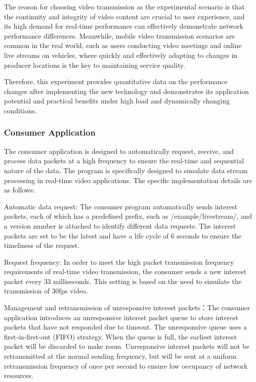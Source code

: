 \documentclass[conference]{IEEEtran}
\begin{document}
The reason for choosing video transmission as the experimental scenario is that the continuity and integrity of video content are crucial to user experience, and its high demand for real-time performance can effectively demonstrate network performance differences. Meanwhile, mobile video transmission scenarios are common in the real world, such as users conducting video meetings and online live streams on vehicles, where quickly and effectively adapting to changes in producer locations is the key to maintaining service quality.

Therefore, this experiment provides quantitative data on the performance changes after implementing the new technology and demonstrates its application potential and practical benefits under high load and dynamically changing conditions.

\subsubsection{Consumer Application}
The consumer application is designed to automatically request, receive, and process data packets at a high frequency to ensure the real-time and sequential nature of the data. The program is specifically designed to simulate data stream processing in real-time video applications. The specific implementation details are as follows:

Automatic data request: The consumer program automatically sends interest packets, each of which has a predefined prefix, such as /example/livestream/, and a version number is attached to identify different data requests. The interest packets are set to be the latest and have a life cycle of 6 seconds to ensure the timeliness of the request.

Request frequency: In order to meet the high packet transmission frequency requirements of real-time video transmission, the consumer sends a new interest packet every 33 milliseconds. This setting is based on the need to simulate the transmission of 30fps video.

Management and retransmission of unresponsive interest packets：The consumer application introduces an unresponsive interest packet queue to store interest packets that have not responded due to timeout. The unresponsive queue uses a first-in-first-out (FIFO) strategy. When the queue is full, the earliest interest packet will be discarded to make room. Unresponsive interest packets will not be retransmitted at the normal sending frequency, but will be sent at a uniform retransmission frequency of once per second to ensure low occupancy of network resources.
\end{document}
